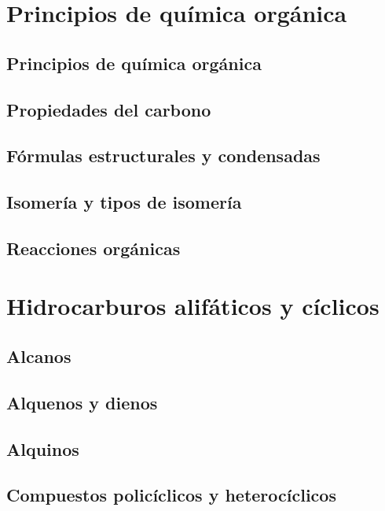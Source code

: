 \documentclass{AsignaturaResumen}
\begin{document}
    \frontmatter

\Portada
\Indices

    \mainmatter
    \restoregeometry



\part{Principios de química orgánica}
    \chapter{Principios de química orgánica}
    \chapter{Propiedades del carbono}
    \chapter{Fórmulas estructurales y condensadas}
    \chapter{Isomería y tipos de isomería}
        
    \chapter{Reacciones orgánicas}
        

\part{Hidrocarburos alifáticos y cíclicos}
    \chapter{Alcanos}
    \chapter{Alquenos y dienos}
    \chapter{Alquinos}
    \chapter{Compuestos policíclicos y heterocíclicos}
\end{document}
